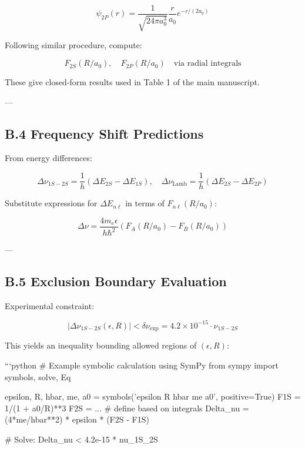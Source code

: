 \[
\psi_{2P}(r) = \dfrac{1}{\sqrt{24\pi a_0^3}} \dfrac{r}{a_0} e^{-r/(2a_0)}
\]



Following similar procedure, compute:



\[
F_{2S}(R/a_0),\quad F_{2P}(R/a_0) \quad \text{via radial integrals}
\]



These give closed-form results used in Table 1 of the main manuscript.

---

\subsection*{B.4 Frequency Shift Predictions}

From energy differences:



\[
\Delta \nu_{1S-2S} = \dfrac{1}{h} \left( \Delta E_{2S} - \Delta E_{1S} \right),\quad
\Delta \nu_{\text{Lamb}} = \dfrac{1}{h} \left( \Delta E_{2S} - \Delta E_{2P} \right)
\]



Substitute expressions for \(\Delta E_{n\ell}\) in terms of \(F_{n\ell}(R/a_0)\):



\[
\Delta \nu = \dfrac{4 m_e \epsilon}{h \hbar^2} \left( F_{A}(R/a_0) - F_{B}(R/a_0) \right)
\]



---

\subsection*{B.5 Exclusion Boundary Evaluation}

Experimental constraint:



\[
\left| \Delta \nu_{1S-2S}(\epsilon, R) \right| < \delta \nu_{\text{exp}} = 4.2 \times 10^{-15} \cdot \nu_{1S-2S}
\]



This yields an inequality bounding allowed regions of \((\epsilon, R)\):

```python
# Example symbolic calculation using SymPy
from sympy import symbols, solve, Eq

epsilon, R, hbar, me, a0 = symbols('epsilon R hbar me a0', positive=True)
F1S = 1/(1 + a0/R)**3
F2S = ...  # define based on integrals
Delta_nu = (4*me/hbar**2) * epsilon * (F2S - F1S)

# Solve: Delta_nu < 4.2e-15 * nu_1S_2S
